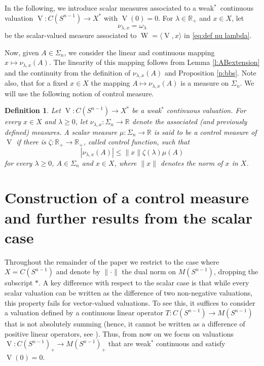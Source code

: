 \documentclass[11pt, a4paper]{amsart}
\newtheorem{definition}[proposition]{Definition}
\newcommand{\sn}{{S^{n-1}}}
\newcommand{\oV}{\operatorname{V}}
\newcommand{\oW}{\operatorname{W}}
\newcommand{\R}{\mathbb R}
\begin{document}
In the following, we introduce  scalar measures associated to a weak$^*$~continuous valuation $\oV\colon C(\sn )\to X^*$ with $\oV(0)=0$. For $\lambda\in \R_{\scriptscriptstyle +}$ and $x\in X$, let 
\begin{equation}\label{eq:defnulambda}
    \nu_{\lambda,x}= \omega_\lambda
\end{equation} 
be the scalar-valued measure associated to $\oW=\langle\oV,x\rangle$ in \eqref{eq:def nu lambda}. 

Now, given $A\in\Sigma_n$, we consider the linear and continuous mapping $x\mapsto \nu_{\lambda,x}(A)$. The linearity of this mapping follows from Lemma \ref{l:ABextension} and the continuity from the definition of $\nu_{\lambda,x}(A)$ and Proposition \ref{p:bbs}. Note also, that for a fixed $x\in X$ the mapping $A\mapsto \nu_{\lambda,x}(A)$ is a measure on $\Sigma_n$. 
\goodbreak
We will use the following notion of control measure.  
\begin{definition}\label{d:Mcontrol}
Let $\oV:C(\sn)\to X^*$ be a weak$^*$ continuous valuation. For every $x\in X$ and $\lambda\geq0$, let $\nu_{\lambda,x}:\Sigma_n\to\mathbb{R}$ denote the associated (and previously defined) measures. A scalar measure $\mu:\Sigma_n\to\mathbb{R}$ is said to be a control measure of $\oV$ if there is $\zeta:\mathbb{R}_{\scriptscriptstyle +}\to\mathbb{R}_{\scriptscriptstyle +}$, called control function, such that
\begin{equation}\label{i:controlmeasure}
        |\nu_{\lambda,x}(A)|\leq \|x\| \zeta(\lambda)\mu(A)
\end{equation}
for every $\lambda\geq0$, $A\in \Sigma_n$ and $x\in X$, where $\|x\|$ denotes the norm of $x$ in $X$.
\end{definition}



\section{Construction of a control measure and further results from the scalar case}\label{S:control}
Throughout the remainder of the paper we restrict to the case where $X=C(\sn)$ and denote by $\|\cdot \|$ the dual norm on $M(\sn)$, dropping the subscript $*$. A key difference with respect to the scalar case is that while every scalar valuation can be written as the difference of two non-negative valuations, this property fails for vector-valued valuations. To see this, it suffices to consider a valuation defined by a continuous linear operator $T:C(S^{n-1})\to M(S^{n-1})$  that is not absolutely summing (hence, it cannot be written as a difference of positive linear operators, see \cite[Chapter 6]{Diestel-Faires}). Thus, from now on we focus on 
valuations $\oV:C(\sn)_{\scriptscriptstyle +}\to M(\sn)_{\scriptscriptstyle +}$ that are weak$^*$ continuous and satisfy $\oV(0)=0$. 
\end{document}
